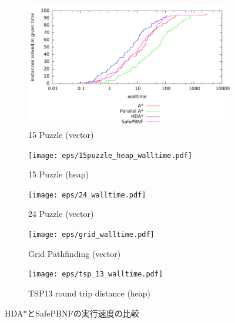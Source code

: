 \documentclass[uplatex]{jsarticle}
\begin{document}
\begin{figure}
	\centering
	\begin{subfigure}{0.4\columnwidth}
		\includegraphics[width=\columnwidth]{eps/15puzzle_vector_walltime.pdf}
		\caption{15 Puzzle (vector)}
		\label{fig:15puzzle_vector}
	\end{subfigure}
	\begin{subfigure}{0.4\columnwidth}
		\texttt{[image: eps/15puzzle\_heap\_walltime.pdf]}
		\caption{15 Puzzle (heap)}
		\label{fig:15puzzle_heap}
	\end{subfigure}
	\begin{subfigure}{0.4\columnwidth}
		\texttt{[image: eps/24\_walltime.pdf]}
		\caption{24 Puzzle (vector)}
		\label{fig:24puzzle_vector}
	\end{subfigure}
	\begin{subfigure}{0.4\columnwidth}
		\texttt{[image: eps/grid\_walltime.pdf]}
		\caption{Grid Pathfinding (vector)}
		\label{fig:grid}
	\end{subfigure}
	\begin{subfigure}{0.4\columnwidth}
		\texttt{[image: eps/tsp\_13\_walltime.pdf]}
		\caption{TSP13 round trip distance (heap)}
		\label{fig:tsp_13}
	\end{subfigure}
	\caption{HDA*とSafePBNFの実行速度の比較}
	\label{fig:comparison}
\end{figure}
\end{document}
